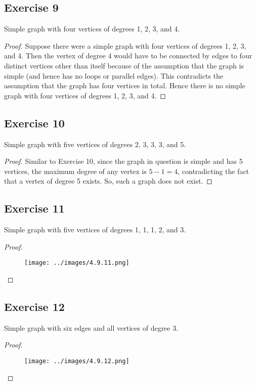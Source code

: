 \documentclass[14pt]{extarticle}
\begin{document}
\subsection{Exercise 9}
Simple graph with four vertices of degrees 1, 2, 3, and 4.

\begin{proof}
    Suppose there were a simple graph with four vertices of degrees 1, 2, 3, and 4. Then the vertex of degree 4 would have to be connected by edges to four distinct vertices other than itself because of the assumption that the graph is simple (and hence has no loops or parallel edges). This contradicts the assumption that the graph has four vertices in total. Hence there is no simple graph with four vertices of degrees 1, 2, 3, and 4.
\end{proof}

\subsection{Exercise 10}
Simple graph with five vertices of degrees 2, 3, 3, 3, and 5.

\begin{proof}
    Similar to Exercise 10, since the graph in question is simple and has 5 vertices, the maximum degree of any vertex is $5 - 1 = 4$, contradicting the fact that a vertex of degree 5 exists. So, such a graph does not exist.
\end{proof}

\subsection{Exercise 11}
Simple graph with five vertices of degrees 1, 1, 1, 2, and 3.
\begin{proof}
    \begin{figure}[ht!]
        \centering
        \texttt{[image: ../images/4.9.11.png]}
    \end{figure}
\end{proof}

\subsection{Exercise 12}
Simple graph with six edges and all vertices of degree 3.

\begin{proof}
    \begin{figure}[ht!]
        \centering
        \texttt{[image: ../images/4.9.12.png]}
    \end{figure}
\end{proof}
\end{document}

